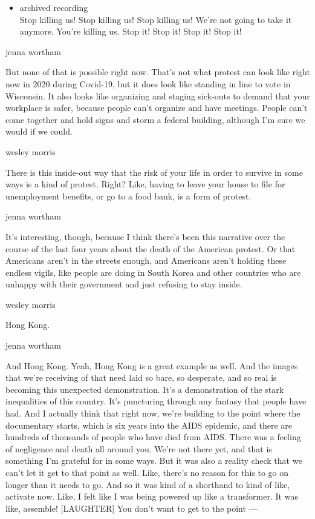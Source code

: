 \begin{itemize}
\tightlist
\item
  archived recording\\
  Stop killing us! Stop killing us! Stop killing us! We're not going to
  take it anymore. You're killing us. Stop it! Stop it! Stop it! Stop
  it!
\end{itemize}

jenna wortham

But none of that is possible right now. That's not what protest can look
like right now in 2020 during Covid-19, but it does look like standing
in line to vote in Wisconsin. It also looks like organizing and staging
sick-outs to demand that your workplace is safer, because people can't
organize and have meetings. People can't come together and hold signs
and storm a federal building, although I'm sure we would if we could.

wesley morris

There is this inside-out way that the risk of your life in order to
survive in some ways is a kind of protest. Right? Like, having to leave
your house to file for unemployment benefits, or go to a food bank, is a
form of protest.

jenna wortham

It's interesting, though, because I think there's been this narrative
over the course of the last four years about the death of the American
protest. Or that Americans aren't in the streets enough, and Americans
aren't holding these endless vigils, like people are doing in South
Korea and other countries who are unhappy with their government and just
refusing to stay inside.

wesley morris

Hong Kong.

jenna wortham

And Hong Kong. Yeah, Hong Kong is a great example as well. And the
images that we're receiving of that need laid so bare, so desperate, and
so real is becoming this unexpected demonstration. It's a demonstration
of the stark inequalities of this country. It's puncturing through any
fantasy that people have had. And I actually think that right now, we're
building to the point where the documentary starts, which is six years
into the AIDS epidemic, and there are hundreds of thousands of people
who have died from AIDS. There was a feeling of negligence and death all
around you. We're not there yet, and that is something I'm grateful for
in some ways. But it was also a reality check that we can't let it get
to that point as well. Like, there's no reason for this to go on longer
than it needs to go. And so it was kind of a shorthand to kind of like,
activate now. Like, I felt like I was being powered up like a
transformer. It was like, assemble! {[}LAUGHTER{]} You don't want to get
to the point ---

